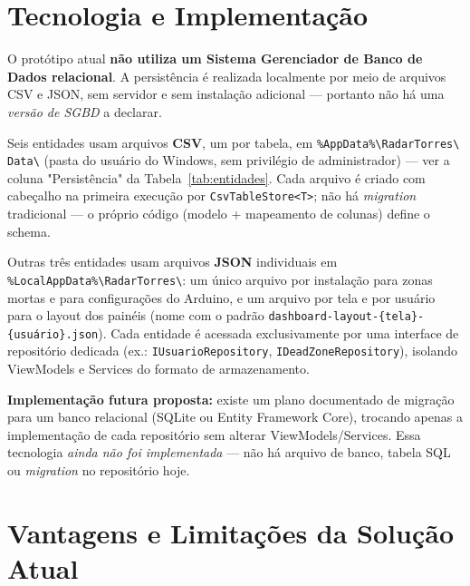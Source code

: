 \section{Tecnologia e Implementação}

O protótipo atual \textbf{não utiliza um Sistema Gerenciador de Banco de Dados relacional}. A
persistência é realizada localmente por meio de arquivos CSV e JSON, sem servidor e sem
instalação adicional — portanto não há uma \textit{versão de SGBD} a declarar.

Seis entidades usam arquivos \textbf{CSV}, um por tabela, em
\texttt{\%AppData\%}\allowbreak\texttt{\textbackslash RadarTorres}\allowbreak\texttt{\textbackslash
Data\textbackslash} (pasta do usuário do Windows, sem privilégio de administrador) — ver a
coluna "Persistência" da Tabela~\ref{tab:entidades}. Cada arquivo é criado com cabeçalho na
primeira execução por \texttt{CsvTableStore<T>}; não há \textit{migration} tradicional — o
próprio código (modelo + mapeamento de colunas) define o schema.

Outras três entidades usam arquivos \textbf{JSON} individuais em
\texttt{\%LocalAppData\%}\allowbreak\texttt{\textbackslash RadarTorres\textbackslash}: um único
arquivo por instalação para zonas mortas e para configurações do Arduino, e um arquivo por tela e
por usuário para o layout dos painéis (nome com o padrão
\texttt{dashboard-}\allowbreak\texttt{layout-\{tela\}-\{usuário\}.json}). Cada entidade é
acessada exclusivamente por uma interface de repositório dedicada (ex.:
\texttt{IUsuario}\allowbreak\texttt{Repository}, \texttt{IDeadZone}\allowbreak\texttt{Repository}),
isolando ViewModels e Services do formato de armazenamento.

\textbf{Implementação futura proposta:} existe um plano documentado de migração para um banco
relacional (SQLite ou Entity Framework Core), trocando apenas a implementação de cada
repositório sem alterar ViewModels/Services. Essa tecnologia \emph{ainda não foi implementada} —
não há arquivo de banco, tabela SQL ou \textit{migration} no repositório hoje.

\section{Vantagens e Limitações da Solução Atual}

